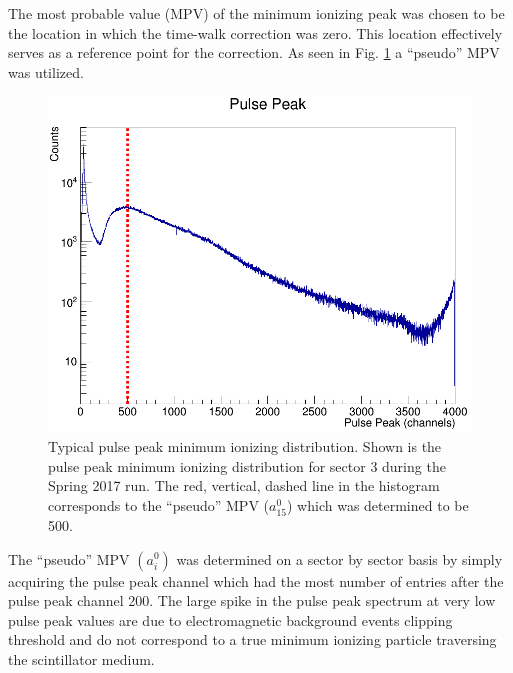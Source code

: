 The most probable value (MPV) of the minimum ionizing peak was chosen to be the location in which the time-walk correction was zero.  This location effectively serves as a reference point for the correction.  As seen in Fig. \ref{fig:pulsepeakch15} a ``pseudo'' MPV was utilized.
	\begin{figure}[!htb]
		\centering
		\includegraphics[width=1.0\columnwidth]{calibration/figs/pulse_peak_ch15}
		\caption{Typical pulse peak minimum ionizing distribution.  Shown is the pulse peak minimum ionizing distribution for sector 3 during the Spring 2017 run. The red, vertical, dashed line in the histogram corresponds to the ``pseudo'' MPV ($a^{0}_{15}$) which was determined to be 500.}
		\label{fig:pulsepeakch15}
	\end{figure}
The ``pseudo'' MPV $(a^{0}_{i})$ was determined on a sector by sector basis by simply acquiring the pulse peak channel which had the most number of entries after the pulse peak channel 200.  The large spike in the pulse peak spectrum at very low pulse peak values are due to electromagnetic background events clipping threshold and do not correspond to a true minimum ionizing particle traversing the scintillator medium.

